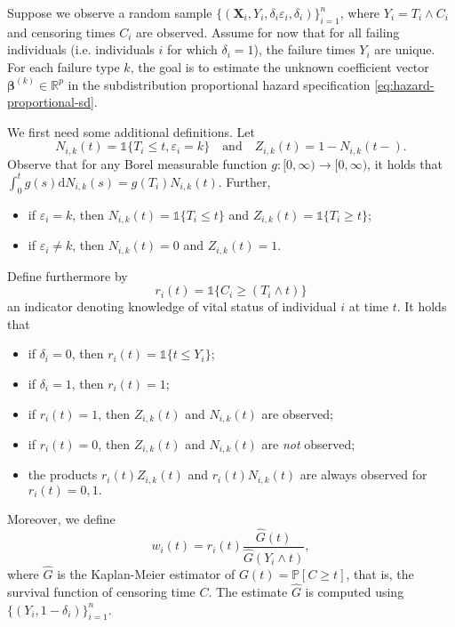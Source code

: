\documentclass[11pt]{article}
\renewcommand{\P}{\mathbb{P}}
\newcommand{\R}{\mathbb{R}}
\newcommand{\X}{\mathbf{X}}
\renewcommand{\b}{\bm{\beta}}
\renewcommand{\d}{\text{d}}
\newcommand{\indic}{\mathds{1}}
\begin{document}
Suppose we observe a random sample  $\big\{ (\X_i, Y_i, \delta_i\varepsilon_i, \delta_i) \big\}_{i=1}^n$, where $Y_i = T_i \wedge C_i$ and censoring times $C_i$ are observed. Assume for now that for all failing individuals (i.e. individuals $i$ for which $\delta_i = 1$), the failure times $Y_i$ are unique. For each failure type $k$, the goal is to estimate the unknown coefficient vector $\b^{(k)}\in\R^p$ in the subdistribution proportional hazard specification \eqref{eq:hazard-proportional-sd}. 

We first need some additional definitions. Let
\[
	N_{i,k}(t) = \indic\{ T_i \leq t, \varepsilon_i = k \}
	\quad \text{and} \quad
	Z_{i,k} (t) = 1 - N_{i,k}(t-).
\]
Observe that for any Borel measurable function $g:[0,\infty)\to[0,\infty)$, it holds that $\int_0^t g(s) \d N_{i,k}(s) = g(T_i) N_{i,k}(t).$ Further,
\begin{itemize}
	\item if $\varepsilon_i = k$, then $N_{i,k}(t) = \indic\{ T_i \leq t \}$ and $Z_{i,k}(t) = \indic\{ T_i \geq t \}$;
	\item if $\varepsilon_i \neq k$, then $N_{i,k}(t) = 0$ and $Z_{i,k}(t) = 1$.
\end{itemize}
Define furthermore by
\[
	r_i(t) = \indic\{ C_i \geq (T_i \wedge t) \}
\]
an indicator denoting knowledge of vital status of individual $i$ at time $t$. It holds that
\begin{itemize}
	\item if $\delta_i = 0$, then $r_i(t) = \indic \{ t \leq Y_i \}$;
	\item if $\delta_i = 1$, then $r_i(t) = 1$;
	\item if $r_i(t) = 1$, then $Z_{i,k}(t)$ and $N_{i,k}(t)$ are observed;
	\item if $r_i(t) = 0$, then $Z_{i,k}(t)$ and $N_{i,k}(t)$ are \textit{not} observed;
	\item the products $r_i(t) Z_{i,k}(t)$ and $r_i(t) N_{i,k}(t)$ are always observed for $r_i(t) = 0,1.$
\end{itemize}
Moreover, we define
\[
	w_i(t) = r_i(t) \frac{\widehat{G}(t)}{\widehat{G}(Y_i \wedge t)},
\]
where $\widehat{G}$ is the Kaplan-Meier estimator of $G(t) = \P[C \geq t]$, that is, the survival function of censoring time $C$. The estimate $\widehat{G}$ is computed using $\{(Y_i, 1 - \delta_i)\}_{i=1}^n$.
\end{document}
